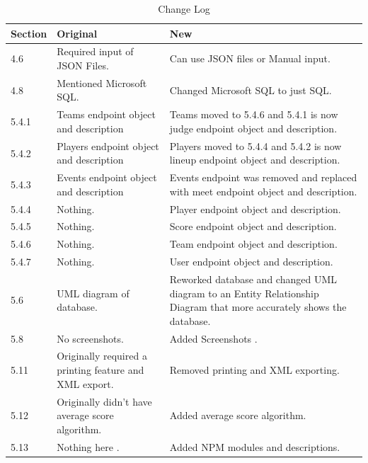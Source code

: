 \documentclass[letterpaper,10pt,draftclsnofoot,onecolumn,]{article}
\begin{document}
\begin{table}[htbp]
    \centering
    \small
    \setlength\tabcolsep{2pt}
    \caption{Change Log}
    \label{tab:change-log}
    \begin{tabular}{p{4em} p{25em} p{25em}}
        \toprule
        Section & Original                                              & New                                \\ \midrule
        4.6     & Required input of JSON Files.                         & Can use JSON files or Manual input. \\
        4.8     & Mentioned Microsoft SQL.                              & Changed Microsoft SQL to just SQL. \\
        5.4.1   & Teams endpoint object and description                 & Teams moved to 5.4.6 and 5.4.1 is now judge endpoint object and description. \\
        5.4.2   & Players endpoint object and description               & Players moved to 5.4.4 and 5.4.2 is now lineup endpoint object and description. \\
        5.4.3   & Events endpoint object and description                & Events endpoint was removed and replaced with meet endpoint object and description. \\
        5.4.4   & Nothing.                                              & Player endpoint object and description. \\
        5.4.5   & Nothing.                                              & Score endpoint object and description. \\
        5.4.6   & Nothing.                                              & Team endpoint object and description. \\
        5.4.7   & Nothing.                                              & User endpoint object and description. \\
        5.6     & UML diagram of database.                              & Reworked database and changed UML diagram to an Entity Relationship Diagram that more accurately shows the database. \\
        5.8     & No screenshots.                                       & Added Screenshots .                 \\
        5.11    & Originally required a printing feature and XML export.& Removed printing and XML exporting. \\
        5.12    & Originally didn't have average score algorithm.       & Added average score algorithm.      \\
        5.13    & Nothing here .                                        & Added NPM modules and descriptions. \\
        \bottomrule
    \end{tabular}
\end{table}
\end{document}
